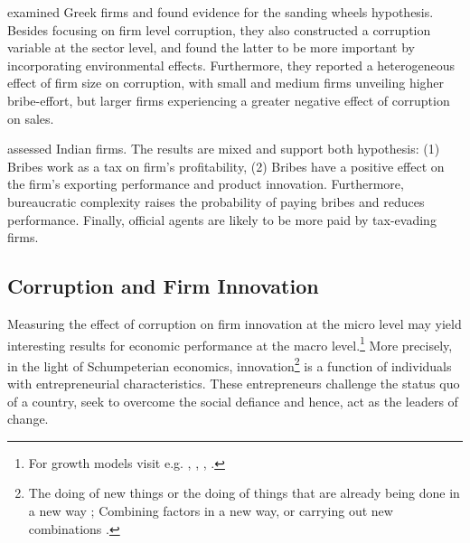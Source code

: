 \citet{athanasouli2012corruption} examined Greek firms and found evidence for the sanding wheels hypothesis. Besides focusing on firm level corruption, they also constructed a corruption variable at the sector level, and found the latter to be more important by incorporating environmental effects.
Furthermore, they reported a heterogeneous effect of firm size on corruption, with small and medium firms unveiling higher bribe-effort, but larger firms experiencing a greater negative effect of corruption on sales. 

\citet{sharma2015corruption} assessed Indian firms. The results are mixed and support both hypothesis: (1) Bribes work as a tax on firm's profitability, (2) Bribes have a positive effect on the firm's exporting performance and product innovation. Furthermore, bureaucratic complexity raises the probability of paying bribes and reduces performance. Finally, official agents are likely to be more paid by tax-evading firms.

\subsection{Corruption and Firm Innovation}
Measuring the effect of corruption on firm innovation at the micro level may yield interesting results for economic performance at the macro level.\footnote{For growth models visit e.g. \citet{romer1986increasing}, \citet{romer1994origins}, \citet{segerstrom1991innovation}, \citet{grossman1991quality}.} More precisely, in the light of Schumpeterian economics, innovation\footnote{The doing of new
 things or the doing of things that are already being done in a new way \citep[p. 151]{schumpeter1947creative}; Combining factors in a new way, or carrying out new combinations \citep[p. 84]{schumpeter1939business}.} is a function of individuals with entrepreneurial characteristics. These entrepreneurs challenge the status quo of a country, seek to overcome the social defiance and hence, act as the leaders of change. \citep[p. 93--94]{sweezy1943professor}

